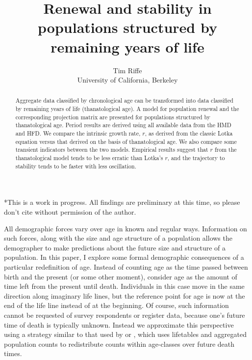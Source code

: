 \documentclass{article}
\begin{document}
\title{Renewal and stability in populations structured by remaining
years of life}
\author{Tim Riffe \\ University of California, Berkeley}
\maketitle

\begin{abstract}
Aggregate data classified by chronological age can be transformed into data
classified by remaining years of life (thanatological age). A model for population renewal and
the corresponding projection matrix are presented for populations structured by
thanatological age. Period results are derived using all available data from the
HMD and HFD. We compare the intrinsic growth rate, $r$, as derived from the
classic Lotka equation versus that derived on the basis of thanatological age.
We also compare some transient indicators between the two
models. Empirical results suggest that $r$ from the thanatological model tends to be less erratic than
Lotka's $r$, and the trajectory to stability tends to be faster with less
oscillation.
\end{abstract}

*This is a work in progress. All findings are preliminary at this time, so
please don't cite without permission of the author.
\vspace{2em}

All demographic forces vary over age in known and regular ways. Information on
such forces, along with the size and age structure of a population allows the
demographer to make predictions about the future size and structure of a population. In this
paper, I explore some formal demographic consequences of a particular
redefinition of age. Instead of counting age as the time passed between birth and the present (or
some other moment), consider age as the amount of time left from the present
until death. Individuals in this case move in the same direction along
imaginary life lines, but the reference point for age is now at the end of the
life line instead of at the beginning. Of course, such information cannot be
requested of survey respondents or register data, because one's future time of
death is typically unknown. Instead we approximate this perspective using a
strategy similar to that used by \citet{miller2001increasing} or
\citet{lee2002approach}, which uses lifetables and aggregated
population counts to redistribute counts within age-classes over future death
times.
\end{document}
